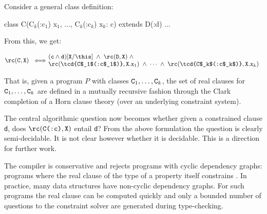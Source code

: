 Consider a general class definition:
\begin{displayxten}
class C(C$_k$(:c$_1$) x$_1$, ..., C$_k$(:c$_k$) x$_k$: c)
  extends D(:d) { ... }
\end{displayxten}

\noindent From this, we get:

$$\rc({\tt C},{\tt X}) ~ \iff \!\!\!\!\!\!\!\!\!\!
\begin{array}{l}
\quad  ({\tt c} \wedge {\tt d})[{\tt X}/\this]
\;\wedge\; \rc({\tt D},{\tt X}) \;\wedge \\
\quad  \rc(\mbox{\tcd{C$_1$(:c$_1$)}}, {\tt X.x}_1) \;\wedge\; \cdots
\;\wedge\; \rc(\mbox{\tcd{C$_k$(:c$_k$)}}, {\tt X.x}_k)
\end{array}
$$

That is, given a program $P$ with classes ${\tt C}_1,\ldots, {\tt
C}_k$, the set of real clauses for ${\tt C}_1,\ldots, {\tt C}_k$ are
defined in a mutually recursive fashion through the Clark completion
of a Horn clause theory (over an underlying constraint system).

The central algorithmic question now becomes whether given a
constrained clause {\tt d}, does $\rc(\mbox{\tt C(:c)},{\tt X})$ entail {\tt d}? 
%
From the above formulation the question is clearly semi-decidable. It
is not clear however whether it is decidable. This is a direction for
further work.

The \Xten{} compiler is conservative and rejects
programs with cyclic dependency graphs: programs where the real
clause of the type
of a property  itself constrains .
%
%
In practice, many data structures have non-cyclic dependency
graphs. For such programs the real clause can be computed quickly and
only a bounded number of questions to the constraint solver are
generated during type-checking.


